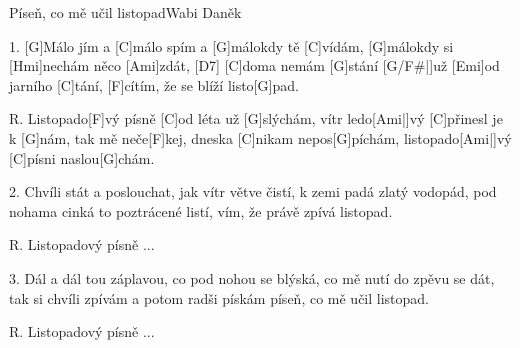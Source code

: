 \begin{song}{Píseň, co mě učil listopad}{Wabi Daněk}

\begin{xverse}{1. }
[G]Málo jím a [C]málo spím a [G]málokdy tě [C]vídám,
[G]málokdy si [Hmi]nechám něco [Ami]zdát, [D7]{}
[C]doma nemám [G]stání [G/F#|]{už} [Emi]od jarního [C]tání,
[F]cítím, že se blíží listo[G]pad.
\end{xverse}

\begin{xverse}{R. }
Listopado[F]vý písně [C]od léta už [G]slýchám,
vítr ledo[Ami|]{vý} [C]přinesl je k [G]nám,
tak mě neče[F]kej, dneska [C]nikam nepos[G]píchám,
listopado[Ami|]{vý} [C]písni naslou[G]chám.
\end{xverse}

\begin{xverse}{2. }
Chvíli stát a poslouchat, jak vítr větve čistí,
k zemi padá zlatý vodopád,
pod nohama cinká to poztrácené listí,
vím, že právě zpívá listopad.
\end{xverse}

\begin{xverse}{R. }
Listopadový písně ...
\end{xverse}

\begin{xverse}{3. }
Dál a dál tou záplavou, co pod nohou se blýská,
co mě nutí do zpěvu se dát,
tak si chvíli zpívám a potom radši pískám
píseň, co mě učil listopad.
\end{xverse}

\begin{xverse}{R. }
Listopadový písně ...
\end{xverse}

\end{song}

